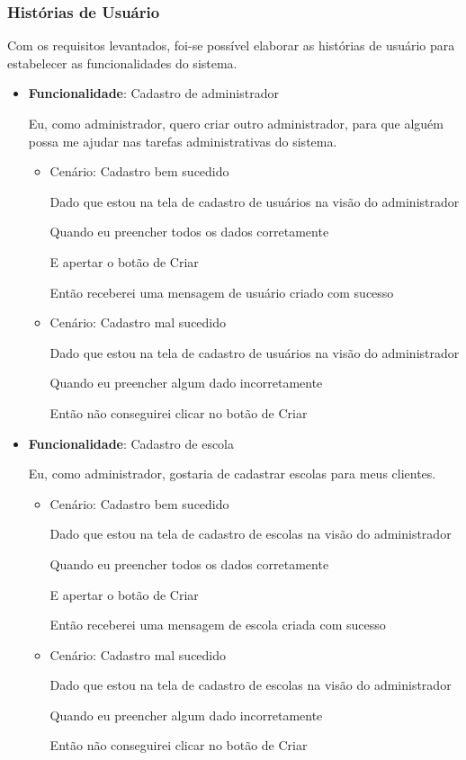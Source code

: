\documentclass[
    12pt,               %
    openright,          %
    oneside,
    a4paper,            %
    english,            %
    brazil              %
    ]{ifsp-spo-inf-ctds} %
\begin{document}
\subsubsection{Histórias de Usuário}
Com os requisitos levantados, foi-se possível elaborar as histórias de usuário para estabelecer as funcionalidades do sistema. 

\begin{itemize}
    \item\textbf{Funcionalidade}: Cadastro de administrador
    
    Eu, como administrador, quero criar outro administrador, para que alguém possa me ajudar nas tarefas administrativas do sistema.
    \begin{itemize}
        \item Cenário: Cadastro bem sucedido  
        \par Dado que estou na tela de cadastro de usuários na visão do administrador
        \par Quando eu preencher todos os dados corretamente
        \par E apertar o botão de Criar
        \par Então receberei uma mensagem de usuário criado com sucesso
    \end{itemize}   
    \begin{itemize}
        \item Cenário: Cadastro mal sucedido  
        \par Dado que estou na tela de cadastro de usuários na visão do administrador
        \par Quando eu preencher algum dado incorretamente
        \par Então não conseguirei clicar no botão de Criar
    \end{itemize}       

\item\textbf{Funcionalidade}: Cadastro de escola
    
    Eu, como administrador, gostaria de cadastrar escolas para meus clientes.
    \begin{itemize}
        \item Cenário: Cadastro bem sucedido  
        \par Dado que estou na tela de cadastro de escolas na visão do administrador
        \par Quando eu preencher todos os dados corretamente
        \par E apertar o botão de Criar
        \par Então receberei uma mensagem de escola criada com sucesso
    \end{itemize}   
    \begin{itemize}
        \item Cenário: Cadastro mal sucedido  
        \par Dado que estou na tela de cadastro de escolas na visão do administrador
        \par Quando eu preencher algum dado incorretamente
        \par Então não conseguirei clicar no botão de Criar
    \end{itemize}    


\end{itemize}
\end{document}

